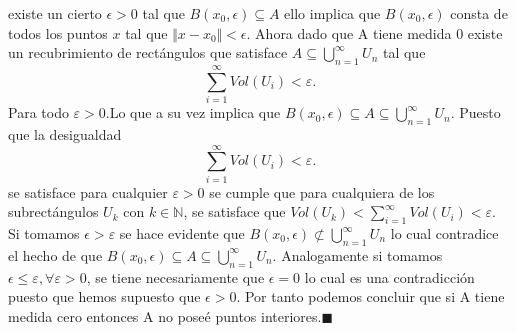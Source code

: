 \documentclass[a4paper,12pt]{article}
\begin{document}
existe un cierto $\epsilon > 0$ tal que $B(x_0,\epsilon) \subseteq A$ ello implica que $B(x_0,\epsilon)$ consta de todos
los puntos $x$ tal que $\Vert x - x_0\Vert < \epsilon$. Ahora dado que A tiene medida 0 existe un recubrimiento de
rectángulos que satisface $A \subseteq  \bigcup_{n = 1}^{\infty} U_n$  tal que
\[\sum_{i = 1}^{\infty} Vol(U_i) < \varepsilon .\]
Para todo $\varepsilon > 0$.Lo que a su vez implica que $B(x_0,\epsilon) \subseteq A \subseteq  \bigcup_{n = 1}^{\infty} U_n$. Puesto que la
desigualdad
\[\sum_{i = 1}^{\infty} Vol(U_i) < \varepsilon .\]
se satisface para cualquier $\varepsilon > 0$ se cumple que para cualquiera de los subrectángulos $U_k$ con $k \in \mathbb{N}$,
se satisface que $Vol(U_k) <  \sum_{i = 1}^{\infty} Vol(U_i) < \varepsilon $. Si tomamos $\epsilon > \varepsilon $ se hace
evidente que $B(x_0,\epsilon) \not \subset  \bigcup_{n = 1}^{\infty} U_n$ lo cual contradice el hecho de que
$B(x_0,\epsilon) \subseteq A \subseteq  \bigcup_{n = 1}^{\infty} U_n$. Analogamente si tomamos
$\epsilon \leq \varepsilon , \forall \varepsilon > 0$, se tiene necesariamente que $\epsilon = 0$ lo cual es una contradicción
puesto que hemos supuesto que $\epsilon > 0$. Por tanto podemos concluir que si A tiene medida cero entonces A no poseé
puntos interiores.$\blacksquare$

\newpage
\end{document}
